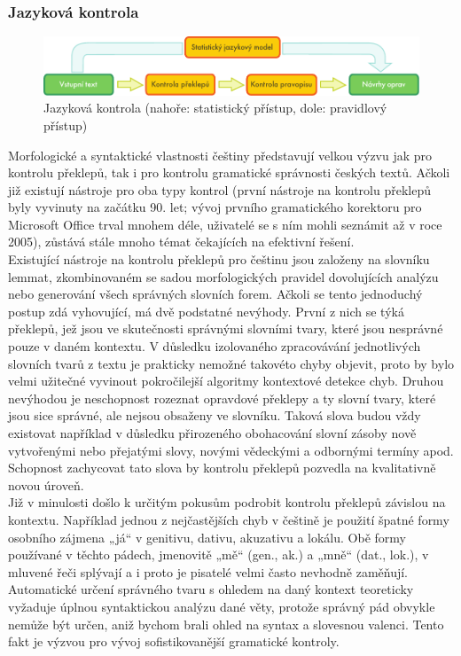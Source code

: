 \begin{multicols}{2}
\subsubsection{Jazyková kontrola}
\begin{figure}[t]
  \center
  \includegraphics[width=\textwidth]{../_media/czech/language_checking}
  \caption{Jazyková kontrola (nahoře: statistický přístup, dole: pravidlový přístup)}
  \label{fig:langcheckingaarch_cz}
\end{figure}
Morfologické a syntaktické vlastnosti češtiny představují velkou výzvu jak pro kontrolu překlepů, tak i pro kontrolu gramatické správnosti českých textů. Ačkoli již existují nástroje pro oba typy kontrol (první nástroje na kontrolu překlepů byly vyvinuty na začátku 90. let; vývoj prvního gramatického korektoru pro Microsoft Office trval mnohem déle, uživatelé se s ním mohli seznámit až v roce 2005), zůstává stále mnoho témat čekajících na efektivní řešení.\\
Existující nástroje na kontrolu překlepů pro češtinu jsou založeny na slovníku lemmat, zkombinovaném se sadou morfologických pravidel dovolujících analýzu nebo generování všech správných slovních forem. Ačkoli se tento jednoduchý postup zdá vyhovující, má dvě podstatné nevýhody. První z nich se týká překlepů, jež jsou ve skutečnosti správnými slovními tvary, které jsou nesprávné pouze v daném kontextu. V důsledku izolovaného zpracovávání jednotlivých slovních tvarů z textu je prakticky nemožné takovéto chyby objevit, proto by bylo velmi užitečné vyvinout pokročilejší algoritmy kontextové detekce chyb. Druhou nevýhodou je neschopnost rozeznat opravdové překlepy a ty slovní tvary, které jsou sice správné, ale nejsou obsaženy ve slovníku. Taková slova budou vždy existovat například v důsledku přirozeného obohacování slovní zásoby nově vytvořenými nebo přejatými slovy, novými vědeckými a odbornými termíny apod. Schopnost zachycovat tato slova by kontrolu překlepů pozvedla na kvalitativně novou úroveň.\\
Již v minulosti došlo k určitým pokusům podrobit kontrolu překlepů závislou na kontextu. Například jednou z nejčastějších chyb v češtině je použití špatné formy osobního zájmena „já“ v genitivu, dativu, akuzativu a lokálu. Obě formy používané v těchto pádech, jmenovitě „mě“ (gen., ak.) a „mně“ (dat., lok.), v mluvené řeči splývají a i proto je pisatelé velmi často nevhodně zaměňují. Automatické určení správného tvaru s ohledem na daný kontext teoreticky vyžaduje úplnou syntaktickou analýzu dané věty, protože správný pád obvykle nemůže být určen, aniž bychom brali ohled na syntax a slovesnou valenci. Tento fakt je výzvou pro vývoj sofistikovanější gramatické kontroly.\\

\end{multicols}
